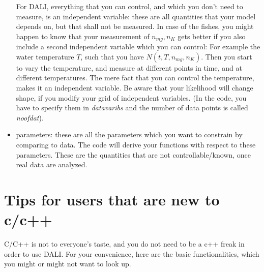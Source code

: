 \documentclass[12pt,twoside]{extarticle}
\begin{document}
\begin{itemize}
For DALI, everything that you can control, and which you don't need to measure, is an independent variable: these are all quantities that your model depends on, but that shall not be measured. In case of the fishes, you might happen to know that your measurement of $n_{mg}, n_K$ gets better if you also include a second independent variable which you can control: For example the water temperature $T$, such that you have $N(t,T, n_{mg}, n_K)$. Then you start to vary the temperature, and measure at different points in time, and at different temperatures. The mere fact that you can control the temperature, makes it an independent variable. Be aware that your likelihood will change shape, if you modify your grid of independent variables. (In the code, you have to specify them in \emph{datavaribs} and the number of data points is called \emph{noofdat}).
\item parameters: these are all the parameters which you want to constrain by comparing to data. The code will derive your functions with respect to these parameters. These are the quantities that are not controllable/known, once real data are analyzed.
\end{itemize}






\section{Tips for users that are new to c/c++}
C/C++ is not to everyone's taste, and you do not need to be a c++ freak in order to use DALI. For your convenience, here are the basic functionalities, which you might or might not want to look up.
\end{document}
